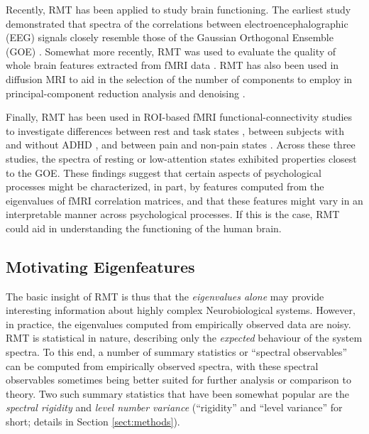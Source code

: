 \documentclass[12pt]{spieman}  %
\begin{document}
\begin{spacing}{2}
Recently, RMT has been applied to study brain functioning. The earliest study
demonstrated that spectra of the correlations between electroencephalographic
(EEG) signals closely resemble those of the Gaussian Orthogonal Ensemble (GOE)
\cite{sebaRandomMatrixAnalysis2003}. Somewhat more recently, RMT was used to
evaluate the quality of whole brain features extracted from fMRI data
\cite{voultsidouFeatureEvaluationFMRI2007,verganiRestingStateFMRI2019}. RMT has
also been used in diffusion MRI to aid in the selection of the number of
components to employ in principal-component reduction analysis and denoising
\cite{veraartDenoisingDiffusionMRI2016,verganiRestingStateFMRI2019,ulfarssonDimensionEstimationNoisy2008}.

Finally, RMT has been used in ROI-based fMRI functional-connectivity studies to
investigate differences between rest and task states
\cite{wangSpectralPropertiesTemporal2015}, between subjects with and without
ADHD \cite{wangRandomMatrixTheory2016}, and between pain and non-pain states
\cite{matharooSpontaneousBackpainAlters2020}. Across these three studies, the
spectra of resting or low-attention states exhibited properties closest to the
GOE. These findings suggest that certain aspects of psychological processes
might be characterized, in part, by features computed from the eigenvalues of
fMRI correlation matrices, and that these features might vary in an
interpretable manner across psychological processes. If this is the case, RMT
could aid in understanding the functioning of the human brain.


\subsection{Motivating Eigenfeatures}

The basic insight of RMT is thus that the \textit{eigenvalues alone} may
provide interesting information about highly complex Neurobiological systems.
However, in practice, the eigenvalues computed from empirically observed data
are noisy. RMT is statistical in nature, describing only the \textit{expected}
behaviour of the system spectra. To this end, a number of summary statistics or
``spectral observables'' \cite{mehtaRandomMatrices2004} can be computed from
empirically observed spectra, with these spectral observables sometimes being
better suited for further analysis or comparison to theory. Two such summary
statistics that have been somewhat popular are the \textit{spectral rigidity}
and \textit{level number variance} (``rigidity'' and ``level variance'' for
short; details in Section \ref{sect:methods}).


\end{spacing}
\end{document}
